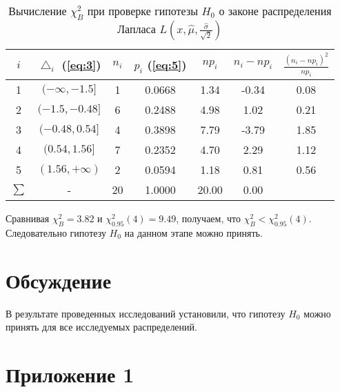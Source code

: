 \documentclass[a4paper, 12pt]{article}
\begin{document}
\begin{table} [H]
\begin{center}
\begin{tabular}{|c|c|c|c|c|c|c|}
\hline 
$i$ & $\bigtriangleup_i$ (\ref{eq:3}) & $n_i$ & $p_i$ (\ref{eq:5}) & $np_i$ & $n_i - np_i$ & $\frac{(n_i-np_i)^2}{np_i}$ \\ 
\hline 
1 & $(-\infty, -1.5]$ & 1 & 0.0668 & 1.34 & -0.34 & 0.08 \\ 
\hline 
2 & $(-1.5, -0.48]$ & 6 & 0.2488 & 4.98 & 1.02 & 0.21 \\ 
\hline 
3 & $(-0.48, 0.54]$ & 4 & 0.3898 & 7.79 & -3.79 & 1.85 \\ 
\hline 
4 & $(0.54, 1.56]$ & 7 & 0.2352 & 4.70 & 2.29 & 1.12 \\ 
\hline 
5 & $(1.56, +\infty)$ & 2 & 0.0594 & 1.18 & 0.81 & 0.56 \\ 
\hline 
$\sum$ & - & 20 & 1.0000 & 20.00 & 0.00 & \color{red}{$3.82= \chi^2_B$} \\ 
\hline 
\end{tabular}
\caption{Вычисление $\chi^2_B$ при проверке гипотезы $H_0$ о законе распределения Лапласа $L \left(x,\widehat{\mu}, \frac{\widehat{\sigma}}{\sqrt{2}} \right)$} 
\end{center}
\end{table}
Сравнивая $\chi^2_B = 3.82$ и $\chi^2_0.95(4) = 9.49$, получаем, что $\chi^2_B < \chi^2_0.95(4)$. Следовательно гипотезу $H_0$ на данном этапе можно принять.

\newpage
\section{Обсуждение}

В результате проведенных исследований установили, что гипотезу $H_0$ можно принять для все исследуемых распределений.

\newpage
\section{Приложение 1}
\begin{figure}[h]
\end{figure}
\end{document}
